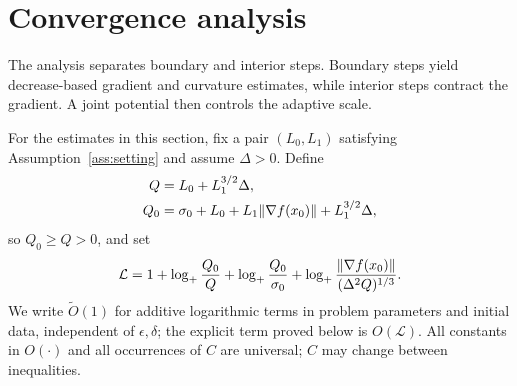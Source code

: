 \section{Convergence analysis}
\label{sec:analysis}
The analysis separates boundary and interior steps. Boundary steps yield
decrease-based gradient and curvature estimates, while interior steps
contract the gradient. A joint potential then controls the adaptive scale.

For the estimates in this section, fix a pair $(L_0,L_1)$ satisfying
Assumption~\ref{ass:setting} and assume $\Delta>0$. Define
\begin{equation}\label{eq:Q}
 \begin{aligned}
 Q&=L_0+L_1^{3/2}\Delta,\\
 Q_0&=\sigma_0+L_0+L_1\lVert\nabla f(x_0)\rVert+L_1^{3/2}\Delta,
 \end{aligned}
\end{equation}
so $Q_0\ge Q>0$, and set
\begin{equation}\label{eq:logs}
 \mathcal L=1+\log_+\frac{Q_0}{Q}
                +\log_+\frac{Q_0}{\sigma_0}
                +\log_+\frac{\lVert\nabla f(x_0)\rVert}{(\Delta^2Q)^{1/3}}.
\end{equation}
We write $\widetilde O(1)$ for additive logarithmic terms in problem
parameters and initial data, independent of $\epsilon,\delta$;
the explicit term proved below is $O(\mathcal L)$.
All constants in $O(\cdot)$ and all occurrences of $C$ are universal;
$C$ may change between inequalities.



